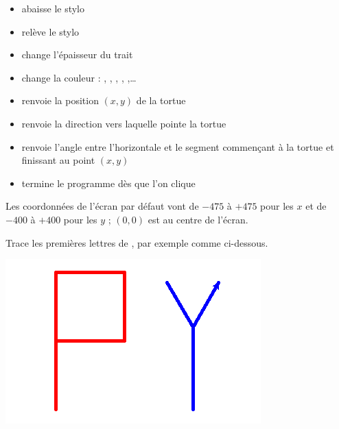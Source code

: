 \documentclass[11pt,class=report,crop=false]{standalone}
\begin{document}
\begin{cours}
\begin{itemize}
  
  \item {} abaisse le stylo
  \item {} relève le stylo
  \item {} change l'épaisseur du trait
  \item {} change la couleur : , , , , ,\ldots
  
  \item {}  renvoie la position $(x,y)$ de la tortue
  \item {} renvoie la direction  vers laquelle pointe la tortue
  \item {} renvoie l'angle entre l'horizontale et le segment commençant à la tortue et finissant au point $(x,y)$
  \item {} termine le programme dès que l'on clique
\end{itemize}

Les coordonnées de l'écran par défaut vont de $-475$ à $+475$ pour les $x$ et
de $-400$ à $+400$ pour les $y$ ; $(0,0)$ est au centre de l'écran.


\end{cours}



\begin{activite}


Trace les premières lettres de \Python{}, par exemple comme ci-dessous.

\begin{center}
\includegraphics[scale=0.4]{ecran-tortue-1}
\end{center}

\end{activite}
\end{document}
